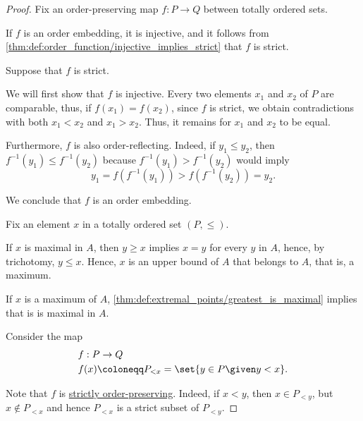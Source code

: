 \begin{proof}
   Fix an order-preserving map \( f: P \to Q \) between totally ordered sets.

  \SufficiencySubProof* If \( f \) is an order embedding, it is injective, and it follows from \cref{thm:def:order_function/injective_implies_strict} that \( f \) is strict.

  \NecessitySubProof* Suppose that \( f \) is strict.

  We will first show that \( f \) is injective. Every two elements \( x_1 \) and \( x_2 \) of \( P \) are comparable, thus, if \( f(x_1) = f(x_2) \), since \( f \) is strict, we obtain contradictions with both \( x_1 < x_2 \) and \( x_1 > x_2 \). Thus, it remains for \( x_1 \) and \( x_2 \) to be equal.

  Furthermore, \( f \) is also order-reflecting. Indeed, if \( y_1 \leq y_2 \), then \( f^{-1}(y_1) \leq f^{-1}(y_2) \) because \( f^{-1}(y_1) > f^{-1}(y_2) \) would imply
  \begin{equation*}
     y_1 = f(f^{-1}(y_1)) > f(f^{-1}(y_2)) = y_2.
  \end{equation*}

  We conclude that \( f \) is an order embedding.

   Fix an element \( x \) in a totally ordered set \( (P, \leq) \).

  \SufficiencySubProof* If \( x \) is maximal in \( A \), then \( y \geq x \) implies \( x = y \) for every \( y \) in \( A \), hence, by trichotomy, \( y \leq x \). Hence, \( x \) is an upper bound of \( A \) that belongs to \( A \), that is, a maximum.

  \NecessitySubProof* If \( x \) is a maximum of \( A \), \cref{thm:def:extremal_points/greatest_is_maximal} implies that is is maximal in \( A \).

   Consider the map
  \begin{equation*}
    \begin{aligned}
      &f: P \to Q \\
      &f(x) \coloneqq P_{<x} = \set{ y \in P \given y < x }.
    \end{aligned}
  \end{equation*}

  Note that \( f \) is \hyperref[def:order_function/preserving]{strictly order-preserving}. Indeed, if \( x < y \), then \( x \in P_{<y} \), but \( x \notin P_{<x} \) and hence \( P_{<x} \) is a strict subset of \( P_{<y} \).


\end{proof}
